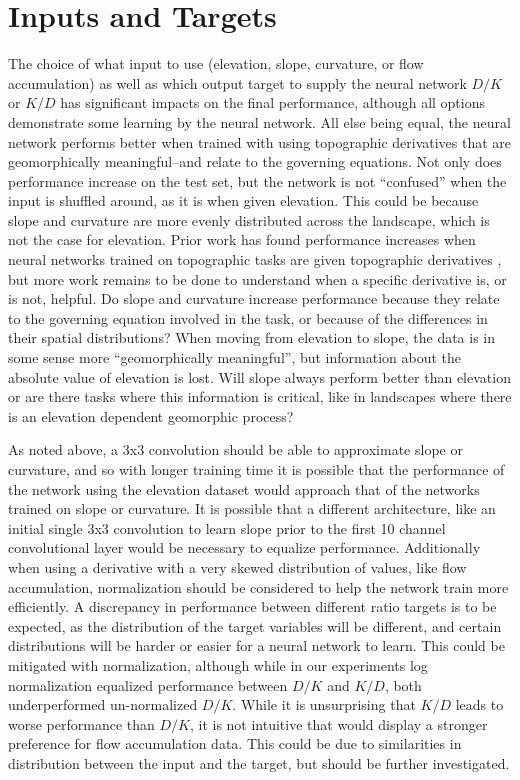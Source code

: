 \documentclass[draft]{agujournal2019}
\begin{document}
\section{Inputs and Targets}
\label{sec:org35b534c}
The choice of what input to use (elevation, slope, curvature, or flow accumulation) as well as which output target to supply the neural network \(D/K\) or \(K/D\) has significant impacts on the final performance, although all options demonstrate some learning by the neural network.  All else being equal, the neural network performs better when trained with using topographic derivatives that are geomorphically meaningful--and relate to the governing equations.  Not only does performance increase on the test set, but the network is not ``confused'' when the input is shuffled around, as it is when given elevation.  This could be because slope and curvature are more evenly distributed across the landscape, which is not the case for elevation.  Prior work has found performance increases when neural networks trained on topographic tasks are given topographic derivatives \cite{maxwellExploringInfluenceInput2023}, but more work remains to be done to understand when a specific derivative is, or is not, helpful.  Do slope and curvature increase performance because they relate to the governing equation involved in the task, or because of the differences in their spatial distributions?  When moving from elevation to slope, the data is in some sense more ``geomorphically meaningful'', but information about the absolute value of elevation is lost.  Will slope always perform better than elevation or are there tasks where this information is critical, like in landscapes where there is an elevation dependent geomorphic process?

As noted above, a 3x3 convolution should be able to approximate slope or curvature, and so with longer training time it is possible that the performance of the network using the elevation dataset would approach that of the networks trained on slope or curvature.  It is possible that a different architecture, like an initial single 3x3 convolution to learn slope prior to the first 10 channel convolutional layer would be necessary to equalize performance.  Additionally when using a derivative with a very skewed distribution of values, like flow accumulation, normalization should be considered to help the network train more efficiently.  A discrepancy in performance between different ratio targets is to be expected, as the distribution of the target variables will be different, and certain distributions will be harder or easier for a neural network to learn. This could be mitigated with normalization, although while in our experiments log normalization equalized performance between \(D/K\) and \(K/D\), both underperformed un-normalized \(D/K\).  While it is unsurprising that \(K/D\) leads to worse performance than \(D/K\), it is not intuitive that would display a stronger preference for flow accumulation data.  This could be due to similarities in distribution between the input and the target, but should be further investigated.
\end{document}

